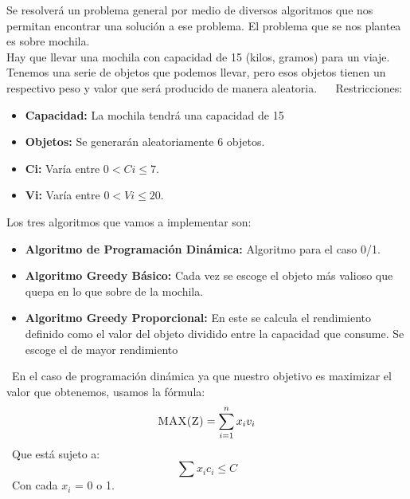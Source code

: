 \documentclass[10pt,letterpaper]{article}
\begin{document}
 \newline \newline 
        Se resolverá un problema general por medio de diversos algoritmos que nos 
        permitan encontrar una solución a ese problema. 
        El problema que se nos plantea es sobre mochila. \\ 
        Hay que llevar una mochila con capacidad de 15 (kilos, gramos) para un viaje. 
        Tenemos una serie de objetos que podemos llevar, pero esos objetos tienen un respectivo peso 
        y valor que será producido de manera aleatoria. \ \ \newline \newline 
        Restricciones: 
        \begin{itemize} 
        \item \textbf{Capacidad:} La mochila tendrá una capacidad de 15 
        \item \textbf{Objetos:} Se generarán aleatoriamente 6 objetos. 
        \item \textbf{C{i}:} Varía entre $0 < C{i} \leq 7$. 
        \item \textbf{V{i}:} Varía entre $0 < V{i} \leq 20$. 
        \end{itemize} 
        Los tres algoritmos que vamos a implementar son: 
        \begin{itemize} 
        \item \textbf{Algoritmo de Programación Dinámica:} Algoritmo para el caso 0/1. 
        \item \textbf{Algoritmo Greedy Básico:} Cada vez se escoge el objeto más 
         valioso que quepa en lo que sobre de la mochila. 
        \item \textbf{Algoritmo Greedy Proporcional:} En este se calcula el rendimiento definido 
        como el valor del objeto dividido entre la capacidad que consume. Se escoge el de mayor rendimiento 
        \end{itemize} 
        \ En el caso de programación dinámica ya que nuestro objetivo es maximizar el valor que obtenemos, usamos la fórmula: 
        \[ \textsc{\normalsize MAX(Z)}\\[0.5cm] = \sum_{i=1}^{n}x_{i}v_{i} \] 
        \ Que está sujeto a:  
        \[ \sum x_{i}c_{i} \leq C \] 
        \ Con cada $x_{i}$ = 0 o 1.  
        \ \ \newline \newline 
        
\end{document}
